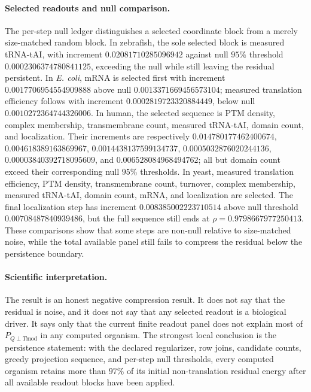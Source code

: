 \paragraph{Selected readouts and null comparison.}
The per-step null ledger distinguishes a selected coordinate block from a merely size-matched random block.  In zebrafish, the sole selected block is measured tRNA-tAI, with increment $0.02081710285096942$ against null $95\%$ threshold $0.0002306374780841125$, exceeding the null while still leaving the residual persistent.  In \emph{E. coli}, mRNA is selected first with increment $0.0017706954554909888$ above null $0.0013371669456573104$; measured translation efficiency follows with increment $0.0002819723320884449$, below null $0.0010272364744326006$.  In human, the selected sequence is PTM density, complex membership, transmembrane count, measured tRNA-tAI, domain count, and localization.  Their increments are respectively $0.014780177462400674$, $0.004618389163869967$, $0.0014438137599134737$, $0.0005032876020244136$, $0.00003840392718095609$, and $0.006528084968494762$; all but domain count exceed their corresponding null $95\%$ thresholds.  In yeast, measured translation efficiency, PTM density, transmembrane count, turnover, complex membership, measured tRNA-tAI, domain count, mRNA, and localization are selected.  The final localization step has increment $0.008385002223710514$ above null threshold $0.00708487840939486$, but the full sequence still ends at $\rho=0.9798667977250413$.  These comparisons show that some steps are non-null relative to size-matched noise, while the total available panel still fails to compress the residual below the persistence boundary.

\paragraph{Scientific interpretation.}
The result is an honest negative compression result.  It does not say that the residual is noise, and it does not say that any selected readout is a biological driver.  It says only that the current finite readout panel does not explain most of $P_{Q\perp T\mathrm{mod}}$ in any computed organism.  The strongest local conclusion is the persistence statement: with the declared regularizer, row joins, candidate counts, greedy projection sequence, and per-step null thresholds, every computed organism retains more than $97\%$ of its initial non-translation residual energy after all available readout blocks have been applied.

